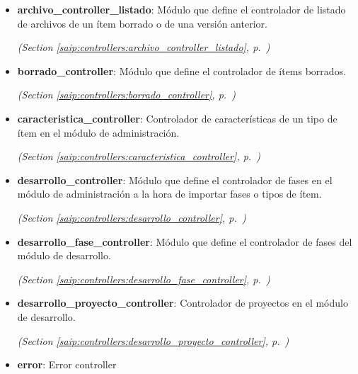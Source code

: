 \begin{itemize}
\begin{itemize}
    \item \textbf{archivo\_controller\_listado}: Módulo que define el controlador de listado de archivos de un ítem borrado 
o de una versión anterior.



  \textit{(Section \ref{saip:controllers:archivo_controller_listado}, p.~\pageref{saip:controllers:archivo_controller_listado})}

    \item \textbf{borrado\_controller}: Módulo que define el controlador de ítems borrados.



  \textit{(Section \ref{saip:controllers:borrado_controller}, p.~\pageref{saip:controllers:borrado_controller})}

    \item \textbf{caracteristica\_controller}: Controlador de características de un tipo de ítem en el módulo de 
administración.



  \textit{(Section \ref{saip:controllers:caracteristica_controller}, p.~\pageref{saip:controllers:caracteristica_controller})}

    \item \textbf{desarrollo\_controller}: Módulo que define el controlador de fases en el módulo de administración a 
la hora de importar fases o tipos de ítem.



  \textit{(Section \ref{saip:controllers:desarrollo_controller}, p.~\pageref{saip:controllers:desarrollo_controller})}

    \item \textbf{desarrollo\_fase\_controller}: Módulo que define el controlador de fases del módulo de desarrollo.



  \textit{(Section \ref{saip:controllers:desarrollo_fase_controller}, p.~\pageref{saip:controllers:desarrollo_fase_controller})}

    \item \textbf{desarrollo\_proyecto\_controller}: Controlador de proyectos en el módulo de desarrollo.



  \textit{(Section \ref{saip:controllers:desarrollo_proyecto_controller}, p.~\pageref{saip:controllers:desarrollo_proyecto_controller})}

    \item \textbf{error}: Error controller




\end{itemize}
\end{itemize}
